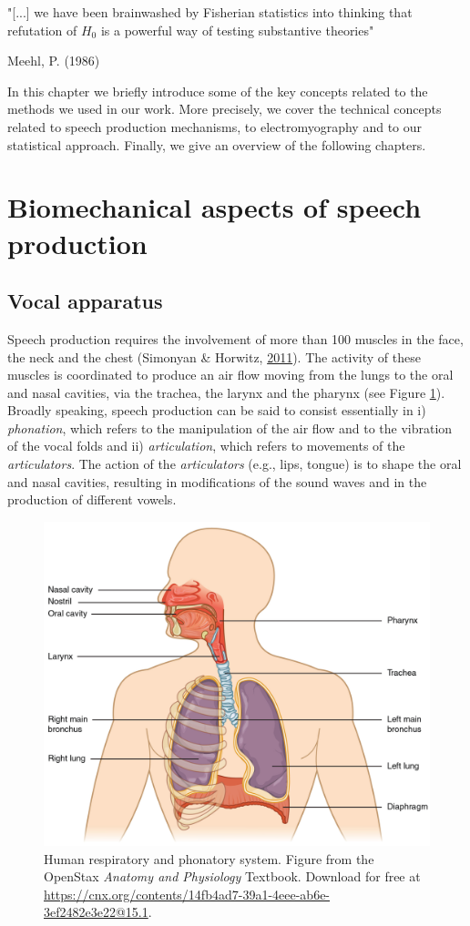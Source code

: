 \documentclass[a4paper,12pt,twoside,openright,oldfontcommands]{memoir}
\newcommand{\initial}[1]{
	\lettrine[lines=3,lhang=0.33,nindent=0em]{
		\color{gray}
     		{\textsc{#1}}}{}}
\begin{document}
\epigraph{"[...] we have been brainwashed by Fisherian statistics into thinking that refutation of $H_{0}$ is a powerful way of testing substantive theories"}{Meehl, P. (1986)}

\initial{I}n this chapter we briefly introduce some of the key concepts related to the methods we used in our work. More precisely, we cover the technical concepts related to speech production mechanisms, to electromyography and to our statistical approach. Finally, we give an overview of the following chapters.

\hypertarget{biomechanical-aspects-of-speech-production}{%
\section{Biomechanical aspects of speech production}\label{biomechanical-aspects-of-speech-production}}

\hypertarget{vocal-apparatus}{%
\subsection{Vocal apparatus}\label{vocal-apparatus}}

Speech production requires the involvement of more than 100 muscles in the face, the neck and the chest (Simonyan \& Horwitz, \protect\hyperlink{ref-simonyan_laryngeal_2011}{2011}). The activity of these muscles is coordinated to produce an air flow moving from the lungs to the oral and nasal cavities, via the trachea, the larynx and the pharynx (see Figure \ref{fig:vocal}). Broadly speaking, speech production can be said to consist essentially in i) \emph{phonation}, which refers to the manipulation of the air flow and to the vibration of the vocal folds and ii) \emph{articulation}, which refers to movements of the \emph{articulators}. The action of the \emph{articulators} (e.g., lips, tongue) is to shape the oral and nasal cavities, resulting in modifications of the sound waves and in the production of different vowels.

\begin{figure}

{\centering \includegraphics[width=0.5\linewidth]{assets/vocal} 

}

\caption{Human respiratory and phonatory system. Figure from the OpenStax \textit{Anatomy and Physiology} Textbook. Download for free at \url{https://cnx.org/contents/14fb4ad7-39a1-4eee-ab6e-3ef2482e3e22@15.1}.}\label{fig:vocal}
\end{figure}
\end{document}
